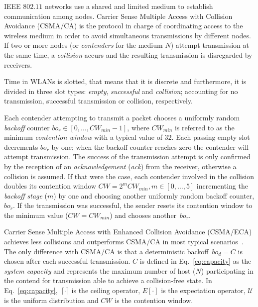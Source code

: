 IEEE $802.11$ networks use a shared and limited medium to establish communication among nodes. Carrier Sense Multiple Access with Collision Avoidance (CSMA/CA) is the protocol in charge of coordinating access to the wireless medium in order to avoid simultaneous transmissions by different nodes. If two or more nodes (or \emph{contenders} for the medium $N$) attempt transmission at the same time, a \emph{collision} accurs and the resulting transmission is disregarded by receivers.

Time in WLANs is slotted, that means that it is discrete and furthermore, it is divided in three slot types: \emph{empty}, \emph{successful} and \emph{collision}; accounting for no transmission, successful transmission or collision, respectively. 

Each contender attempting to transmit a packet chooses a uniformly random \emph{backoff} counter $bo_{r} \in [0,\ldots,CW_{min}-1]$, where $CW_{min}$ is referred to as the minimum \emph{contention window} with a typical value of $32$. Each passing empty slot decrements $bo_{r}$ by one; when the backoff counter reaches zero the contender will attempt transmission. The success of the transmission attempt is only confirmed by the reception of an \emph{acknowledgement} (\emph{ack}) from the receiver, otherwise a collision is assumed. If that were the case, each contender involved in the collision doubles its contention window $CW = 2^{m}CW_{min}, m\in[0,\ldots,5]$ incrementing the \emph{backoff stage} ($m$) by one and choosing another uniformly random backoff counter, $bo_{r}$. If the transmission was successful, the sender resets its contention window to the minimum value ($CW=CW_{min}$) and chooses another~$bo_{r}$.

Carrier Sense Multiple Access with Enhanced Collision Avoidance (CSMA/ECA) achieves less collisions and outperforms CSMA/CA in most typical scenarios~\cite{CSMA_ECA}. The only difference with CSMA/CA is that a deterministic backoff~$bo_{d} = C$ is chosen after each successful transmission. $C$ is defined in Eq.~\ref{eq:capacity} as the \emph{system capacity} and represents the maximum number of host ($N$) participating in the contend for transmission able to achieve a collision-free state. In Eq.~\ref{eq:capacity},~$\lceil{\cdotp}\rceil$ is the ceiling operator, $E[\cdotp]$ is the expectation operator, $\mathcal{U}$ is the uniform distribution and $CW$ is the contention window.


